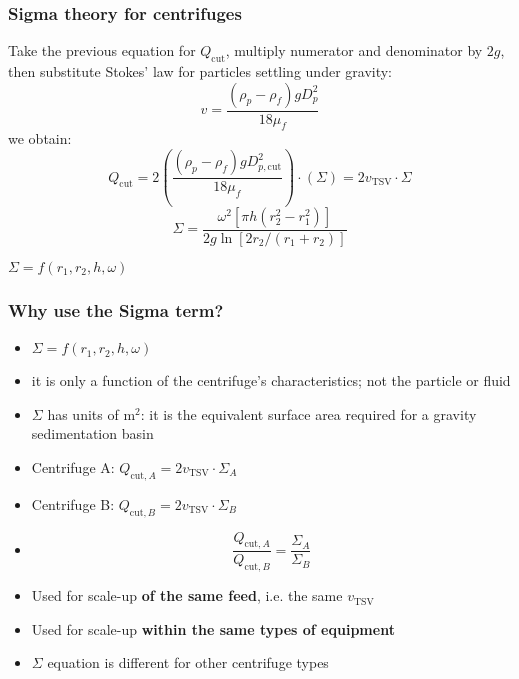 \begin{frame}\frametitle{Sigma theory for centrifuges}
	Take the previous equation for $Q_\text{cut}$, multiply numerator and denominator by $2g$, then substitute Stokes' law for particles settling under gravity:
	\[
		v = \frac{\left( \rho_p - \rho_f \right) g D_p^2}{18 \mu_f}
	\]
	we obtain:
	\[
		Q_\text{cut} =  2\left( \frac{\left( \rho_p - \rho_f \right) g D_{p,\text{cut}}^2}{18 \mu_f}  \right) \cdot ( \Sigma ) = 2 v_\text{TSV} \cdot \Sigma
	\]
	\[
		\Sigma = \frac{\omega^2 \left[\pi h \left(r_2^2 - r_1^2\right)\right]}{2g \ln \left[2r_2/(r_1+r_2) \right]} 
	\]
	
	\vspace{12pt}
	$\Sigma = f(r_1, r_2, h, \omega)$
\end{frame}

\begin{frame}\frametitle{Why use the Sigma term?}
	\begin{itemize}
		\item	$\Sigma = f(r_1, r_2, h, \omega)$
		\item	it is only a function of the centrifuge's characteristics; not the particle or fluid
		\item	$\Sigma$ has units of $\text{m}^2$: it is the equivalent surface area required for a gravity sedimentation basin
		\item	Centrifuge A: $Q_{\text{cut},A} = 2 v_\text{TSV} \cdot \Sigma_A$
		\item	Centrifuge B: $Q_{\text{cut},B} = 2 v_\text{TSV} \cdot \Sigma_B$
		\item	\[
					\frac{Q_{\text{cut},A}}{Q_{\text{cut},B}}  = \frac{\Sigma_A}{\Sigma_B}
				\]
		\item	Used for scale-up \textbf{of the same feed}, i.e. the same $v_\text{TSV}$
		\item	Used for scale-up \textbf{within the same types of equipment}
		\item	$\Sigma$ equation is different for other centrifuge types				
	\end{itemize}	
\end{frame}

